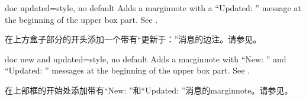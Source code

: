 \begin{docTcbKey}[][doc new=2014-09-19]{doc updated}{=}{style, no default}
Adds a marginnote with a \enquote{Updated: } message at the beginning of
the upper box part. See .

在上方盒子部分的开头添加一个带有\enquote{更新于：}消息的边注。请参见。
\end{docTcbKey}


\begin{docTcbKey}[][doc new=2014-09-19]{doc new and updated}{=}{style, no default}
Adds a marginnote with \enquote{New: } and \enquote{Updated: } messages at the beginning of
the upper box part. See .

在上部框的开始处添加带有\enquote{New: }和\enquote{Updated: }消息的marginnote。请参见。
\end{docTcbKey}

